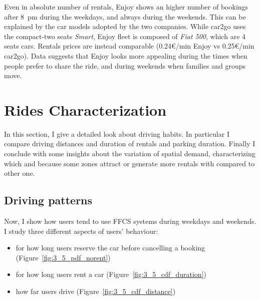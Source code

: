 Even in absolute number of rentals, Enjoy shows an higher number of bookings after 8~pm during the weekdays, and always during the weekends. This can be explained by the car models adopted by the two companies. While car2go uses the compact-two seats \textit{Smart}, Enjoy fleet is composed of \textit{Fiat 500}, which are 4 seats cars. Rentals prices are instead comparable (0.24\euro/min Enjoy vs 0.25\euro/min car2go). Data suggests that Enjoy looks more appealing during the times when people prefer to share the ride, and during weekends when families and groups move. 



\section{Rides Characterization}
In this section, I give a detailed look about driving habits. In particular I compare driving distances and duration of rentals and parking duration. Finally I conclude with some insights about the variation of spatial demand, characterizing which and because some zones attract or generate more rentals with compared to other one.


\subsection{Driving patterns}




Now, I show how users tend to use FFCS systems during weekdays and weekends. I study three different aspects of users' behaviour: 
\begin{itemize}
	\item for how long users reserve the car before cancelling a booking (Figure~\ref{fig:3_5_pdf_norent})
	\item for how long users rent a car (Figure~\ref{fig:3_5_cdf_duration})
	\item how far users drive (Figure~\ref{fig:3_5_cdf_distance})
\end{itemize}

